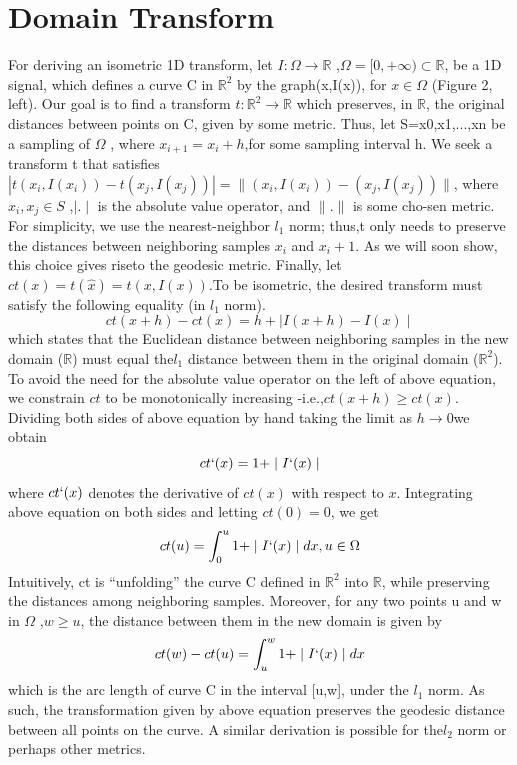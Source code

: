 \documentclass[conference]{IEEEtran}
\begin{document}
 \section{Domain Transform}
 For  deriving  an  isometric  1D  transform,  let $I: \Omega \rightarrow \mathbb{R}$ ,$\Omega  =[0,+\infty) \subset \mathbb{R}$, be a 1D signal, which defines a curve C in $\mathbb{R}^2$ by the  graph(x,I(x)),  for $x \in \Omega$ (Figure  2,  left).   Our  goal  is  to find a transform $t:\mathbb{R}^2 \rightarrow \mathbb{R}$ which preserves, in $\mathbb{R}$, the original distances between points on C,  given by some metric.   Thus,  let S={x0,x1,...,xn} be a sampling of $\Omega$ , where $x_{i+1}=x_i+h$,for some sampling interval h.  We seek a transform t that satisfies $|t(x_i,I(x_i))-t(x_j,I(x_j))|=\parallel(x_i,I(x_i))-(x_j,I(x_j))\parallel $, where $x_i,x_j \in S$ ,$\mid . \mid$ is the absolute value operator, and $\parallel .\parallel$ is some cho-sen metric.  For simplicity, we use the nearest-neighbor $l_1$ norm; thus,t only needs to preserve the distances between neighboring samples $x_i$ and $x_i+1$.  As we will soon show, this choice gives riseto the geodesic metric.   Finally,  let $ct(x)  =t(\hat{x})  =t(x,I(x))$.To be isometric,  the desired transform must satisfy the following equality (in $l_1$ norm).
 $$ct(x+h)-ct(x) = h+\mid I(x+h)- I(x) \mid$$
 which states that the Euclidean distance between neighboring samples  in  the  new  domain  ($\mathbb{R}$)  must  equal  the$l_1$ distance  between them in the original domain ($\mathbb{R}^2$).  To avoid the need for the absolute value operator on the left of above equation, we constrain $ct$ to be monotonically increasing -i.e.,$ct(x+h) \geq ct(x)$. Dividing both sides of above equation by hand taking the limit as $h \rightarrow 0$we obtain
 $$ct`(x) = 1 +\mid I`(x) \mid$$
 where $ct`(x)$ denotes the derivative of $ct(x)$ with respect to $x$.  Integrating above equation on both sides and letting $ct(0) = 0$, we get
 $$ct(u) = \int_0^u1 + \mid I`(x) \mid dx,u \in \Omega$$
 Intuitively, ct is “unfolding” the curve C defined in $\mathbb{R}^2$ into $\mathbb{R}$, while preserving the distances among neighboring samples.   Moreover,  for  any  two  points u and w in $\Omega$ ,$w \geq u$,  the distance between them in the new domain is given by
$$ct(w)-ct(u) = \int_u^w1 + \mid I`(x) \mid dx$$
which is the arc length of curve C in the interval [u,w], under the $l_1$ norm.   As  such,  the  transformation given  by above equation preserves the geodesic distance between all points on the curve.  A similar derivation is possible for the$l_2$ norm or perhaps other metrics.
 
\end{document}
